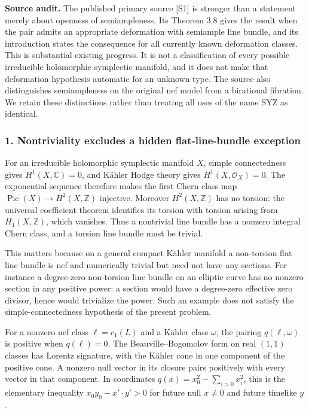 \documentclass[11pt]{article}
\begin{document}
\textbf{Source audit.} The published primary source [S1] is stronger than a statement merely about openness of semiampleness. Its Theorem 3.8 gives the result when the pair admits an appropriate deformation with semiample line bundle, and its introduction states the consequence for all currently known deformation classes. This is substantial existing progress. It is not a classification of every possible irreducible holomorphic symplectic manifold, and it does not make that deformation hypothesis automatic for an unknown type. The source also distinguishes semiampleness on the original nef model from a birational fibration. We retain these distinctions rather than treating all uses of the name SYZ as identical.

\subsubsection{1. Nontriviality excludes a hidden flat-line-bundle exception}
For an irreducible holomorphic symplectic manifold $X$, simple connectedness gives $H^1(X,\mathbb C)=0$, and K\"ahler Hodge theory gives $H^1(X,\mathcal O_X)=0$. The exponential sequence therefore makes the first Chern class map
$\operatorname{Pic}(X)\to H^2(X,\mathbb Z)$ injective. Moreover $H^2(X,\mathbb Z)$ has no torsion: the universal coefficient theorem identifies its torsion with torsion arising from $H_1(X,\mathbb Z)$, which vanishes. Thus a nontrivial line bundle has a nonzero integral Chern class, and a torsion line bundle must be trivial.

This matters because on a general compact K\"ahler manifold a non-torsion flat line bundle is nef and numerically trivial but need not have any sections. For instance a degree-zero non-torsion line bundle on an elliptic curve has no nonzero section in any positive power: a section would have a degree-zero effective zero divisor, hence would trivialize the power. Such an example does not satisfy the simple-connectedness hypothesis of the present problem.

For a nonzero nef class $\ell=c_1(L)$ and a K\"ahler class $\omega$, the pairing $q(\ell,\omega)$ is positive when $q(\ell)=0$. The Beauville--Bogomolov form on real $(1,1)$ classes has Lorentz signature, with the K\"ahler cone in one component of the positive cone. A nonzero null vector in its closure pairs positively with every vector in that component. In coordinates $q(x)=x_0^2-\sum_{i>0}x_i^2$, this is the elementary inequality $x_0y_0-x'\cdot y'>0$ for future null $x\ne0$ and future timelike $y$.
\end{document}
